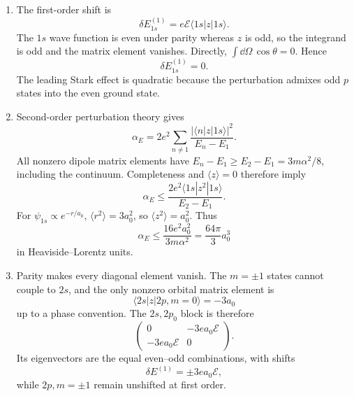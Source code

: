 \begin{enumerate}
\begin{enumerate}
\item
The first-order shift is
\[
 \delta E_{1s}^{(1)}=e\mathcal E\langle1s|z|1s\rangle.
\]
The \(1s\) wave function is even under parity whereas \(z\) is odd, so the
integrand is odd and the matrix element vanishes.  Directly,
\(\int \dd\Omega\,\cos\theta=0\).  Hence
\[
 \boxed{\delta E_{1s}^{(1)}=0.}
\]
The leading Stark effect is quadratic because the perturbation admixes odd
\(p\) states into the even ground state.
\item
Second-order perturbation theory gives
\[
 \alpha_E=2e^2\sum_{n\ne1}
 \frac{|\langle n|z|1s\rangle|^2}{E_n-E_1}.
\]
All nonzero dipole matrix elements have
\(E_n-E_1\geq E_2-E_1=3m\alpha^2/8\), including the continuum.  Completeness
and \(\langle z\rangle=0\) therefore imply
\[
 \alpha_E\leq
 \frac{2e^2\langle1s|z^2|1s\rangle}{E_2-E_1}.
\]
For \(\psi_{1s}\propto e^{-r/a_0}\),
\(\langle r^2\rangle=3a_0^2\), so \(\langle z^2\rangle=a_0^2\).  Thus
\[
 \boxed{\alpha_E\leq\frac{16e^2a_0^2}{3m\alpha^2}
 =\frac{64\pi}{3}a_0^3}
\]
in Heaviside--Lorentz units.
\item
Parity makes every diagonal element vanish.  The \(m=\pm1\) states cannot
couple to \(2s\), and the only nonzero orbital matrix element is
\[
 \langle2s|z|2p,m=0\rangle=-3a_0
\]
up to a phase convention.  The \(2s,2p_0\) block is therefore
\[
 \begin{pmatrix}0&-3ea_0\mathcal E\\
 -3ea_0\mathcal E&0\end{pmatrix}.
\]
Its eigenvectors are the equal even--odd combinations, with shifts
\[
 \boxed{\delta E^{(1)}=\pm3ea_0\mathcal E,}
\]
while \(2p,m=\pm1\) remain unshifted at first order.
\end{enumerate}


\end{enumerate}
